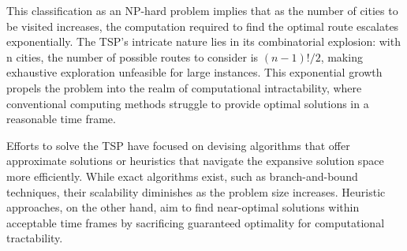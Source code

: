 This classification as an NP-hard problem implies that as the number of cities to be visited increases, the computation required to find the optimal route escalates exponentially. The TSP's intricate nature lies in its combinatorial explosion: with n cities, the number of possible routes to consider is $(n-1)!/2$, making exhaustive exploration unfeasible for large instances. This exponential growth propels the problem into the realm of computational intractability, where conventional computing methods struggle to provide optimal solutions in a reasonable time frame.

Efforts to solve the TSP have focused on devising algorithms that offer approximate solutions or heuristics that navigate the expansive solution space more efficiently. While exact algorithms exist, such as branch-and-bound techniques, their scalability diminishes as the problem size increases. Heuristic approaches, on the other hand, aim to find near-optimal solutions within acceptable time frames by sacrificing guaranteed optimality for computational tractability.

